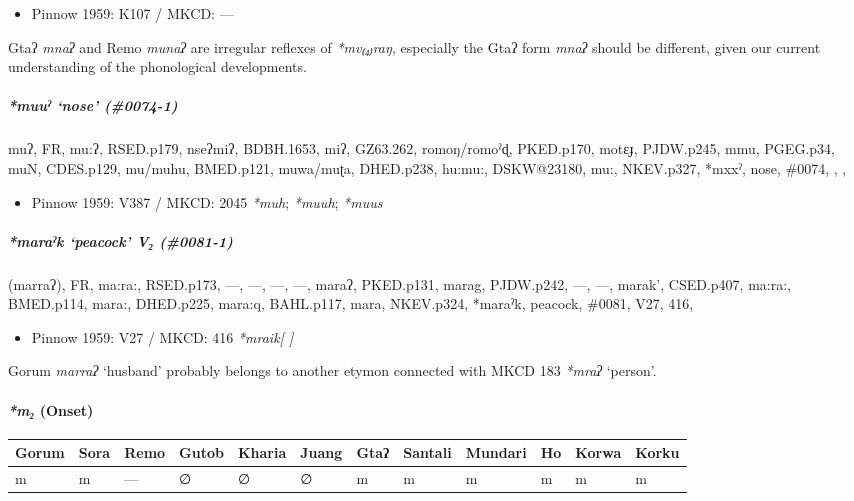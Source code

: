 \documentclass[a4paper,]{article}
\providecommand{\tightlist}{%
  \setlength{\itemsep}{0pt}\setlength{\parskip}{0pt}}
\let\oldparagraph\paragraph
\renewcommand{\paragraph}[1]{\oldparagraph{#1}\mbox{}}
\let\oldsubparagraph\subparagraph
\renewcommand{\subparagraph}[1]{\oldsubparagraph{#1}\mbox{}}
\begin{document}
\begin{itemize}
\tightlist
\item
  Pinnow 1959: K107 / MKCD: ---
\end{itemize}

Gtaʔ \emph{mnaʔ} and Remo \emph{munaʔ} are irregular reflexes of
\emph{*mv₍₄₎raŋ}, especially the Gtaʔ form \emph{mnaʔ} should be
different, given our current understanding of the phonological
developments.

\subparagraph{\texorpdfstring{\emph{*muuˀ} `nose'
(\#0074-1)}{*muuˀ nose (\#0074-1)}}\label{muuux2c0-nose-0074-1}

muʔ, FR, mu:ʔ, RSED.p179, nseʔmiʔ, BDBH.1653, miʔ, GZ63.262,
romoŋ/romoˀɖ, PKED.p170, motɛɟ, PJDW.p245, mmu, PGEG.p34, muN,
CDES.p129, mu/muhu, BMED.p121, muwa/muʈa, DHED.p238, hu:mu:, DSKW@23180,
mu:, NKEV.p327, *mxxˀ, nose, \#0074, , ,

\begin{itemize}
\tightlist
\item
  Pinnow 1959: V387 / MKCD: 2045 \emph{*muh}; \emph{*muuh}; \emph{*muus}
\end{itemize}

\subparagraph{\texorpdfstring{\emph{*maraˀk} `peacock' V₂
(\#0081-1)}{*maraˀk peacock V₂ (\#0081-1)}}\label{maraux2c0k-peacock-v-0081-1}

(marraʔ), FR, ma:ra:, RSED.p173, ---, ---, ---, ---, maraʔ, PKED.p131,
marag, PJDW.p242, ---, ---, marak', CSED.p407, ma:ra:, BMED.p114, mara:,
DHED.p225, mara:q, BAHL.p117, mara, NKEV.p324, *maraˀk, peacock, \#0081,
V27, 416,

\begin{itemize}
\tightlist
\item
  Pinnow 1959: V27 / MKCD: 416 \emph{*mraik{[} {]}}
\end{itemize}

Gorum \emph{marraʔ} `husband' probably belongs to another etymon
connected with MKCD 183 \emph{*mraʔ} `person'.

\paragraph{\texorpdfstring{\emph{*m₂}
(Onset)}{*m₂ (Onset)}}\label{m-onset-1}

\begin{longtable}[]{@{}llllllllllll@{}}
\toprule
Gorum & Sora & Remo & Gutob & Kharia & Juang & Gtaʔ & Santali & Mundari
& Ho & Korwa & Korku\tabularnewline
\midrule
\endhead
m & m & --- & ∅ & ∅ & ∅ & m & m & m & m & m & m\tabularnewline
\bottomrule
\end{longtable}
\end{document}
